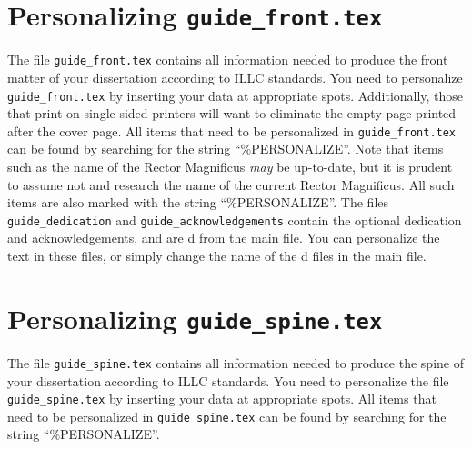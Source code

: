 \section{Personalizing {\tt guide\_front.tex}}
The file {\tt guide\_front.tex} contains all information needed 
to produce the front matter of your dissertation according to ILLC standards.
You need to personalize {\tt guide\_front.tex} by inserting your data
at appropriate spots. Additionally, those that print on single-sided
printers will want to eliminate the empty page printed after the cover page.
All items that need to be personalized in 
{\tt guide\_front.tex} can be found by searching for the string 
``\%{}PERSONALIZE''.
Note that items such as the name of the Rector Magnificus {\em may} be 
up-to-date, but it is prudent to assume not and research the name of
the current Rector Magnificus. All such items are also marked with
the string ``\%{}PERSONALIZE''.
The files {\tt guide\_dedication} and {\tt guide\_acknowledgements} 
contain the optional dedication and acknowledgements, and are \verb||d
from the main file.
You can personalize the text in these files, or simply change the name
of the \verb||d files in the main file.

\section{Personalizing {\tt guide\_spine.tex}}
The file {\tt guide\_spine.tex} contains all information needed
to produce the spine of your dissertation according to ILLC standards.
You need to personalize the file {\tt guide\_spine.tex} by inserting 
your data at appropriate spots. All items that need to be personalized in
{\tt guide\_spine.tex} can be found by searching for the string
``\%{}PERSONALIZE''.
